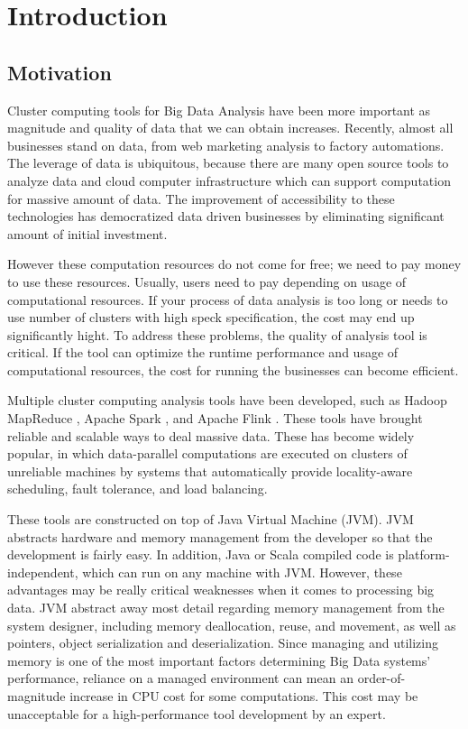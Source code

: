 \chapter{Introduction}
\label{chapter:Introduction}
\thispagestyle{myheadings}


\section{Motivation}
\label{sec:motivation}
Cluster computing tools for Big Data Analysis have been more important as magnitude and quality of data that we can obtain increases. 
Recently, almost all businesses stand on data, from web marketing analysis to factory automations. The leverage of data is ubiquitous, because 
there are many open source tools to analyze data and cloud computer infrastructure which can support computation for massive amount of data. 
The improvement of accessibility to these technologies has democratized data driven businesses by 
eliminating significant amount of initial investment. 

However these computation resources do not come for free; we need to pay money to use these resources. Usually, users need to pay depending on usage of computational resources. 
If your process of data analysis is too long or needs to use number of clusters with high speck specification, the cost may end up significantly hight.
To address these problems, the quality of analysis tool is critical. If the tool can optimize the runtime performance and usage of computational resources, 
the cost for running the businesses can become efficient.

Multiple cluster computing analysis tools have been developed, such as Hadoop MapReduce \cite{ApacheHadoopHomePage}, 
Apache Spark \cite{ApacheSparkHomePage}, and Apache Flink \cite{ApacheFlinkHomePage} \cite{DBLP:journals/debu/CarboneKEMHT15}. 
These tools have brought reliable and scalable ways to deal massive data. 
These has become widely popular, in which data-parallel computations are executed on clusters of unreliable machines by systems that automatically provide locality-aware scheduling, 
fault tolerance, and load balancing. 

These tools are constructed on top of Java Virtual Machine (JVM). JVM abstracts hardware and memory management from the developer so that the development is fairly easy. 
In addition, Java or Scala compiled code is platform-independent, which can run on any machine with JVM. However, these advantages may be really critical weaknesses when it comes to 
processing big data. JVM abstract away most detail regarding memory management from the system designer, including memory deallocation, reuse, and movement, as well as pointers, 
object serialization and deserialization. Since managing and utilizing memory is one of the most important factors determining Big Data systems' performance, 
reliance on a managed environment can mean an order-of-magnitude increase in CPU cost for some computations. This cost may be unacceptable for a high-performance tool development by an expert.

